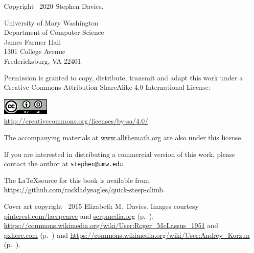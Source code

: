 
\thispagestyle{empty}

Copyright \textcopyright \ 2020 Stephen Davies.

\bigskip

University of Mary Washington\\
Department of Computer Science\\
James Farmer Hall\\
1301 College Avenue\\
Fredericksburg, VA  22401

\vspace{.4in}

Permission is granted to copy, distribute, transmit and adapt this work under a
Creative Commons Attribution-ShareAlike 4.0 International License:

\begin{center}
\includegraphics{cc_license.png}\\
\smallskip
\url{http://creativecommons.org/licenses/by-sa/4.0/}
\end{center}

The accompanying materials at \url{www.allthemath.org} are also under this
license.

\vspace{.2in}
If you are interested in distributing a commercial version of this work, please
contact the author at \texttt{stephen@umw.edu}.

\vspace{.4in}
The \LaTeX source for this book is available from:
\url{https://github.com/rockladyeagles/quick-steep-climb}.


\vspace{.7in}
Cover art copyright \textcopyright \ 2015 Elizabeth M.~Davies.
Images courtesy \url{pinterest.com/laerpearce} and \url{serpmedia.org}
(p.~\pageref{tacoma}),
\url{https://commons.wikimedia.org/wiki/User:Roger\_McLassus\_1951} and
\url{pxhere.com} (p.~\pageref{slinky}) and 
\url{https://commons.wikimedia.org/wiki/User:Andrey_Korzun}
(p.~\pageref{orchard}).
